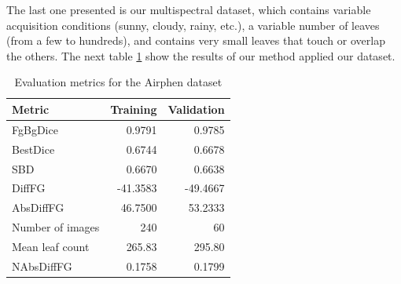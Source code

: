 \documentclass[../thesis.tex]{subfiles}
\begin{document}
    The last one presented is our multispectral dataset, which contains variable acquisition conditions (sunny, cloudy, rainy, etc.), a variable number of leaves (from a few to hundreds), and contains very small leaves that touch or overlap the others. The next table \ref{tab:eval-Airphen} show the results of our method applied our dataset.
    
    \begin{table}[H]
        \begin{tabularx}{\linewidth}{|X|r|r|}
            \hline
            \textbf{Metric} 	& \textbf{Training} &  \textbf{Validation}  \\ \hline
            FgBgDice 	        &   0.9791 &   0.9785 \\
            BestDice 	        &   0.6744 &   0.6678 \\
            SBD 	            &   0.6670 &   0.6638 \\
            DiffFG 	        	& -41.3583 & -49.4667 \\
            AbsDiffFG       	&  46.7500 &  53.2333 \\ \hline
            Number of images 	&      240 &      60  \\
            Mean leaf count 	&   265.83 &  295.80  \\
            NAbsDiffFG          &   0.1758 &  0.1799  \\
            
            \hline
        \end{tabularx}
        \caption{Evaluation metrics for the Airphen dataset}
        \label{tab:eval-Airphen}
    \end{table}
    
\end{document}
